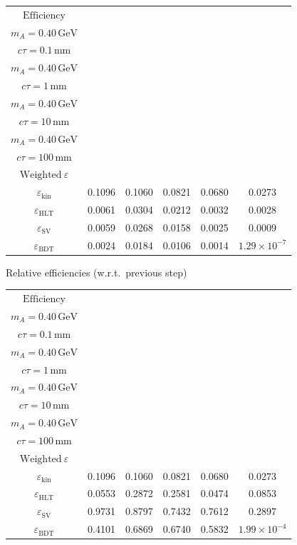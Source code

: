 \documentclass[10pt,a4paper]{article}
\begin{document}
{\begin{tabular}{cccccc}
\toprule
$\mathrm{Efficiency}$ & \shortstack{$m_{\pi}=4\,\mathrm{GeV}$\\$m_{A}=0.40\,\mathrm{GeV}$\\$c\tau=0.1\,\mathrm{mm}$} & \shortstack{$m_{\pi}=4\,\mathrm{GeV}$\\$m_{A}=0.40\,\mathrm{GeV}$\\$c\tau=1\,\mathrm{mm}$} & \shortstack{$m_{\pi}=4\,\mathrm{GeV}$\\$m_{A}=0.40\,\mathrm{GeV}$\\$c\tau=10\,\mathrm{mm}$} & \shortstack{$m_{\pi}=4\,\mathrm{GeV}$\\$m_{A}=0.40\,\mathrm{GeV}$\\$c\tau=100\,\mathrm{mm}$} & \shortstack{$\mathrm{QCD}$\\$\mathrm{Weighted}\ \varepsilon$} \\
\midrule
$\varepsilon_{\mathrm{kin}}$ & 0.1096 & 0.1060 & 0.0821 & 0.0680 & 0.0273\\
$\varepsilon_{\mathrm{HLT}}$ & 0.0061 & 0.0304 & 0.0212 & 0.0032 & 0.0028\\
$\varepsilon_{\mathrm{SV}}$ & 0.0059 & 0.0268 & 0.0158 & 0.0025 & 0.0009\\
$\varepsilon_{\mathrm{BDT}}$ & 0.0024 & 0.0184 & 0.0106 & 0.0014 & $1.29\times10^{-7}$\\
\bottomrule
\end{tabular}

\vspace{18pt}

Relative efficiencies (w.r.t.\ previous step)

\begin{tabular}{cccccc}
\toprule
$\mathrm{Efficiency}$ & \shortstack{$m_{\pi}=4\,\mathrm{GeV}$\\$m_{A}=0.40\,\mathrm{GeV}$\\$c\tau=0.1\,\mathrm{mm}$} & \shortstack{$m_{\pi}=4\,\mathrm{GeV}$\\$m_{A}=0.40\,\mathrm{GeV}$\\$c\tau=1\,\mathrm{mm}$} & \shortstack{$m_{\pi}=4\,\mathrm{GeV}$\\$m_{A}=0.40\,\mathrm{GeV}$\\$c\tau=10\,\mathrm{mm}$} & \shortstack{$m_{\pi}=4\,\mathrm{GeV}$\\$m_{A}=0.40\,\mathrm{GeV}$\\$c\tau=100\,\mathrm{mm}$} & \shortstack{$\mathrm{QCD}$\\$\mathrm{Weighted}\ \varepsilon$} \\
\midrule
$\varepsilon_{\mathrm{kin}}$ & 0.1096 & 0.1060 & 0.0821 & 0.0680 & 0.0273\\
$\varepsilon_{\mathrm{HLT}}$ & 0.0553 & 0.2872 & 0.2581 & 0.0474 & 0.0853\\
$\varepsilon_{\mathrm{SV}}$ & 0.9731 & 0.8797 & 0.7432 & 0.7612 & 0.2897\\
$\varepsilon_{\mathrm{BDT}}$ & 0.4101 & 0.6869 & 0.6740 & 0.5832 & $1.99\times10^{-4}$\\
\bottomrule
\end{tabular}

}
\end{document}
